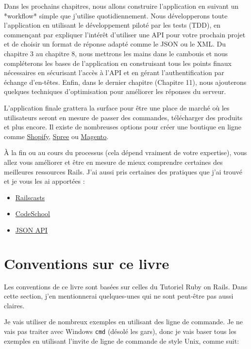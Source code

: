 \documentclass[]{report}
\begin{document}
  Dans les prochains chapitres, nous allons construire l'application en suivant un *workflow* simple que j'utilise quotidiennement. Nous développerons toute l'application en utilisant le développement piloté par les tests (TDD), en commençant par expliquer l’intérêt d'utiliser une API pour votre prochain projet et de choisir un format de réponse adapté comme le JSON ou le XML. Du chapitre 3 au chapitre 8, nous mettrons les mains dans le cambouis et nous compléterons les bases de l'application en construisant tous les points finaux nécessaires en sécurisant l'accès à l'API et en gérant l'authentification par échange d'en-têtes. Enfin, dans le dernier chapitre (Chapitre 11), nous ajouterons quelques techniques d'optimisation pour améliorer les réponses du serveur.

  L'application finale grattera la surface pour être une place de marché où les utilisateurs seront en mesure de passer des commandes, télécharger des produits et plus encore. Il existe de nombreuses options pour créer une boutique en ligne comme \href{http://shopify.com/}{Shopify}, \href{http://spreecommerce.com/}{Spree} ou \href{http://magento.com/}{Magento}.

  À la fin ou au cours du processus (cela dépend vraiment de votre expertise), vous allez vous améliorer et être en mesure de mieux comprendre certaines des meilleures ressources Rails. J'ai aussi pris certaines des pratiques que j'ai trouvé et je vous les ai apportées :

  \begin{itemize}
    \item \href{http://railscasts.com/}{Railscasts}
    \item \href{http://codeschool.com/}{CodeSchool}
    \item \href{http://jsonapi.org/format/}{JSON API}
  \end{itemize}

  \section{Conventions sur ce livre}

    Les conventions de ce livre sont basées sur celles du Tutoriel Ruby on Rails. Dans cette section, j'en mentionnerai quelques-unes qui ne sont peut-être pas aussi claires.

    Je vais utiliser de nombreux exemples en utilisant des ligne de commande. Je ne vais pas traiter avec Windows \verb|cmd| (désolé les gars), donc je vais baser tous les exemples en utilisant l'invite de ligne de commande de style Unix, comme suit:
\end{document}
